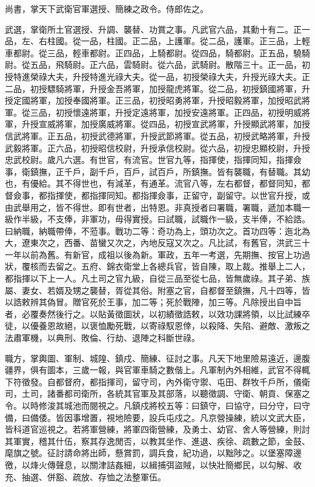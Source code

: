 尚書，掌天下武衛官軍選授、簡練之政令。侍郎佐之。

武選，掌衛所土官選授、升調、襲替、功賞之事。凡武官六品，其勳十有二。正一品，左、右柱國。從一品，柱國。正二品，上護軍。從二品，護軍。正三品，上輕車都尉。從三品，輕車都尉。正四品，上騎都尉。從四品，騎都尉。正五品，驍騎尉。從五品，飛騎尉。正六品，雲騎尉。從六品，武騎尉。散階三十。正一品，初授特進榮祿大夫，升授特進光祿大夫。從一品，初授榮祿大夫，升授光祿大夫。正二品，初授驃騎將軍，升授金吾將軍，加授龍虎將軍。從二品，初授鎮國將軍，升授定國將軍，加授奉國將軍。正三品，初授昭勇將軍，升授昭毅將軍，加授昭武將軍。從三品，初授懷遠將軍，升授定遠將軍，加授安遠將軍。正四品，初授明威將軍，升授宣威將軍，加授廣威將軍。從四品，初授宣武將軍，升授顯武將軍，加授信武將軍。正五品，初授武德將軍，升授武節將軍。從五品，初授武略將軍，升授武毅將軍。正六品，初授昭信校尉，升授承信校尉。從六品，初授忠顯校尉，升授忠武校尉。歲凡六選。有世官，有流官。世官九等，指揮使，指揮同知，指揮僉事，衛鎮撫，正千戶，副千戶，百戶，試百戶，所鎮撫。皆有襲職，有替職。其幼也，有優給。其不得世也，有減革，有通革。流官八等，左右都督，都督同知，都督僉事，都指揮使，都指揮同知。都指揮僉事，正留守，副留守。以世官升授，或由武舉用之，皆不得世。即有世者，出特恩。非真授者曰署職，署職，遞加本職一級作半級，不支俸，非軍功，毋得實授。曰試職，試職作一級，支半俸，不給誥。曰納職，納職帶俸，不蒞事。戰功二等：奇功為上，頭功次之。首功四等：迤北為大，遼東次之，西番、苗蠻又次之，內地反寇又次之。凡比試，有舊官，洪武三十一年以前為舊。有新官，成祖以後為新。軍政，五年一考選，先期撫、按官上功過狀，覆核而去留之。五府、錦衣衛堂上各總兵官，皆自陳，取上裁。推舉上二人，都指揮以下上一人。凡土司之官九級，自從三品至從七品，皆無歲祿。其子弟、族屬、妻女、若婿及甥之襲替，胥從其俗。附塞之官，自都督至鎮撫，凡十四等，皆以誥敕辨其偽冒。贈官死於王事，加二等；死於戰陣，加三等。凡除授出自中旨者，必覆奏然後行之。以貼黃徵圖狀，以初績徵誥敕，以效功課將領，以比試練卒徒，以優養恩故絕，以褒恤勵死戰，以寄祿馭恩倖，以殺降、失陷、避敵、激叛之法肅軍機，以典刑、敗倫、行劫、退陣之科斷世祿。

職方，掌輿圖、軍制、城隍、鎮戍、簡練、征討之事。凡天下地里險易遠近，邊腹疆界，俱有圖本，三歲一報，與官軍車騎之數偕上。凡軍制內外相維，武官不得輒下符徵發。自都督府，都指揮司，留守司，內外衛守禦、屯田、群牧千戶所，儀衛司，土司，諸番都司衛所，各統其官軍及其部落，以聽徵調、守衛、朝貢、保塞之令。以時修浚其城池而閱視之。凡鎮戍將校五等：曰鎮守，曰協守，曰分守，曰守備，曰備倭。皆因事增置，視地險要，設兵屯戍之。凡京營操練，統以文武大臣，皆科道官巡視之。若將軍營練，將軍四衛營練，及勇士、幼官、舍人等營練，則討其軍實，稽其什伍，察其存逸閒否，以教其坐作、進退、疾徐、疏數之節，金鼓、麾旗之號。征討請命將出師，懸賞罰，調兵食，紀功過，以黜陟之。以堡塞障邊徼，以烽火傳聲息，以關津詰姦細，以緝捕弭盜賊，以快壯簡鄉民，以勾解、收充、抽選、併豁、疏放、存恤之法整軍伍。

